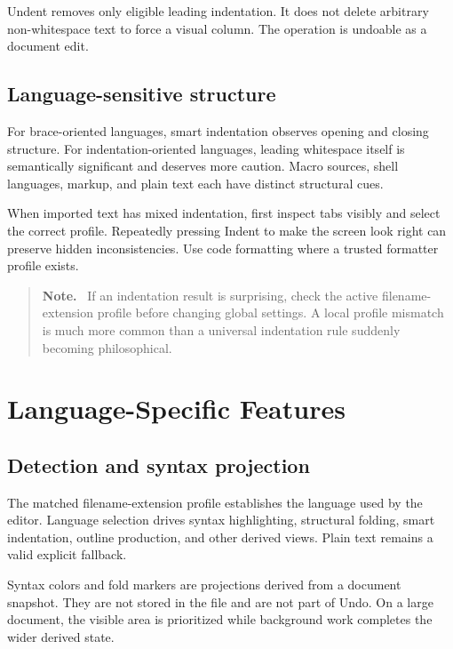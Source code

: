 \documentclass[a4paper,10pt,twoside,openany]{book}
\newenvironment{usernote}{\begin{quote}\small\textbf{Note.}\ }{\end{quote}}
\begin{document}
Undent removes only eligible leading indentation. It does not delete
arbitrary non-whitespace text to force a visual column. The operation is
undoable as a document edit.

\section{Language-sensitive structure}

For brace-oriented languages, smart indentation observes opening and closing
structure. For indentation-oriented languages, leading whitespace itself is
semantically significant and deserves more caution. Macro sources, shell
languages, markup, and plain text each have distinct structural cues.

When imported text has mixed indentation, first inspect tabs visibly and
select the correct profile. Repeatedly pressing Indent to make the screen look
right can preserve hidden inconsistencies. Use code formatting where a
trusted formatter profile exists.

\begin{usernote}
If an indentation result is surprising, check the active filename-extension
profile before changing global settings. A local profile mismatch is much
more common than a universal indentation rule suddenly becoming philosophical.
\end{usernote}

\chapter{Language-Specific Features}

\section{Detection and syntax projection}

The matched filename-extension profile establishes the language used by the
editor. Language selection drives syntax highlighting, structural folding,
smart indentation, outline production, and other derived views. Plain text
remains a valid explicit fallback.

Syntax colors and fold markers are projections derived from a document
snapshot. They are not stored in the file and are not part of Undo. On a
large document, the visible area is prioritized while background work
completes the wider derived state.
\end{document}
